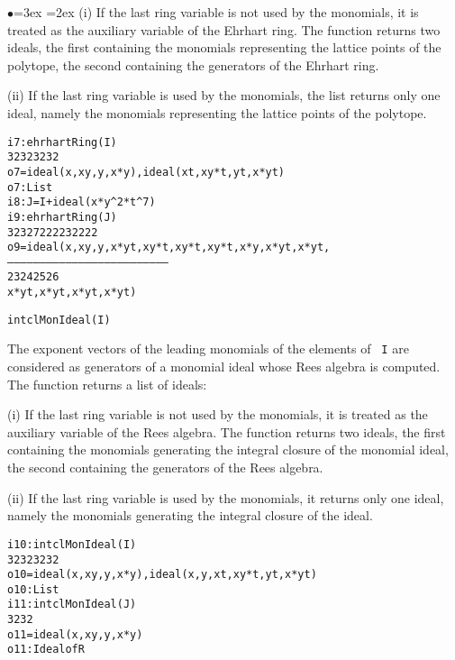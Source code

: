 \documentclass[11pt]{amsart}
\newenvironment{example}
  {\begin{alltt}\small}
  {\end{alltt}}
\newenvironment{functions}
  {\begin{list}{$\bullet$}{\leftmargin=3ex \labelwidth=2ex
  \listparindent=0pt \itemsep=6pt \parsep=3pt}}
  {\end{list}}
\begin{document}
\begin{functions}
\noindent(i) If the last ring variable is not used by the
monomials, it is treated as the auxiliary variable of the Ehrhart
ring. The function returns two ideals, the first containing the
monomials representing the lattice points of the polytope, the
second containing the generators of the Ehrhart ring.

\noindent(ii) If the last ring variable is used by the monomials,
the list returns only one ideal, namely the monomials
representing the lattice points of the polytope.



\begin{example}
i7 : ehrhartRing(I)
               3   2    3     2           3    2      3      2
o7 = {ideal (x , x y, y , x*y ), ideal (x t, x y*t, y t, x*y t)}
o7 : List
i8 : J=I+ideal(x*y^2*t^7)
i9 : ehrhartRing(J)
              3   2    3     2 7   2      2   2   2   3     2     2      2 2 
o9 = ideal (x , x y, y , x*y t , x y*t, x y*t , x y*t , x*y , x*y t, x*y t ,
      --------------------------------------------------------------------------
         2 3     2 4     2 5     2 6
      x*y t , x*y t , x*y t , x*y t )

\end{example}

\item \verb+intclMonIdeal(I)+

The exponent vectors of the leading monomials of the elements of {\tt
I} are considered as generators of a monomial ideal whose Rees
algebra is computed. The function returns a list of ideals:

\noindent(i) If the last ring variable is not used by the
monomials, it is treated as the auxiliary variable of the Rees
algebra. The function returns two ideals, the first containing the
monomials generating the integral closure of the monomial ideal,
the second containing the generators of the Rees algebra.

\noindent(ii) If the last ring variable is used by the monomials,
it returns only one ideal, namely the monomials
generating the integral closure of the ideal.
\begin{example}
i10 : intclMonIdeal(I)
               3   2    3     2                 3    2      3      2
o10 = {ideal (x , x y, y , x*y ), ideal (x, y, x t, x y*t, y t, x*y t)}
o10 : List
i11 : intclMonIdeal(J)
              3   2    3     2
o11 = ideal (x , x y, y , x*y )
o11 : Ideal of R
\end{example}


\end{functions}
\end{document}
